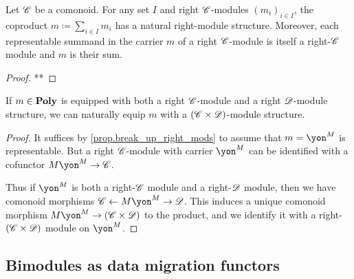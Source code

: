\documentclass[DynamicalBook]{subfiles}
\begin{document}
\begin{proposition}\label{prop.break_up_right_mods}
Let $\mathscr{C}$ be a comonoid. For any set $I$ and right $\mathscr{C}$-modules $(m_i)_{i\in I}$, the coproduct $m\coloneqq \sum_{i\in I}m_i$ has a natural right-module structure. Moreover, each representable summand in the carrier $m$ of a right $\mathscr{C}$-module is itself a right-$\mathscr{C}$ module and $m$ is their sum.
\end{proposition}
\begin{proof}
**
\end{proof}
%
%
%

\begin{proposition}
If $m\in\textbf{Poly}$ is equipped with both a right $\mathscr{C}$-module and a right $\mathscr{D}$-module structure, we can naturally equip $m$ with a $(\mathscr{C}\times\mathscr{D})$-module structure.
\end{proposition}
\begin{proof}
It suffices by \cref{prop.break_up_right_mods} to assume that $m=\yon^M$ is representable. But a right $\mathscr{C}$-module with carrier $\yon^M$ can be identified with a cofunctor $M\yon^M\to\com{C}$.

Thus if $\yon^M$ is both a right-$\mathscr{C}$ module and a right-$\mathscr{D}$ module, then we have comonoid morphisms $\com{C}\from M\yon^M\to\com{D}$. This induces a unique comonoid morphism $M\yon^M\to(\com{C}\times\com{D})$ to the product, and we identify it with a right-$(\mathscr{C}\times\mathscr{D})$ module on $\yon^M$.
\end{proof}


\subsection{Bimodules as data migration functors}
\end{document}
